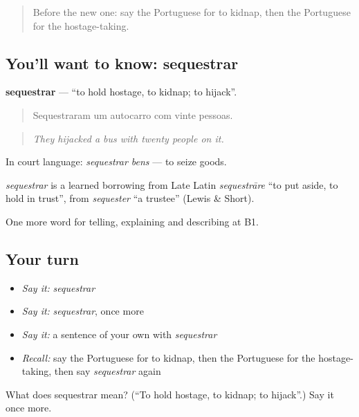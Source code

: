 \begin{quote}
Before the new one: say the Portuguese for to kidnap, then the Portuguese for the hostage-taking.
\end{quote}

\subsection*{You'll want to know: sequestrar}
\textbf{sequestrar} — \textquotedblleft{}to hold hostage, to kidnap; to hijack\textquotedblright{}.

\begin{quote}
Sequestraram um autocarro com vinte pessoas.
\end{quote}

\begin{quote}
\emph{They hijacked a bus with twenty people on it.}
\end{quote}

In court language: \emph{sequestrar bens} — to seize goods.

\begin{cousinweb}
\emph{sequestrar} is a learned borrowing from Late Latin \emph{sequestrāre} \textquotedblleft{}to put aside, to hold in trust\textquotedblright{}, from \emph{sequester} \textquotedblleft{}a trustee\textquotedblright{} (Lewis \& Short).
\end{cousinweb}

\begin{grammarlens}[title={What you've built}]
One more word for telling, explaining and describing at B1.
\end{grammarlens}

\subsection*{Your turn}
\begin{itemize}
\raggedright
  \item \emph{Say it:} \emph{sequestrar}
  \item \emph{Say it:} \emph{sequestrar}, once more
  \item \emph{Say it:} a sentence of your own with \emph{sequestrar}
  \item \emph{Recall:} say the Portuguese for to kidnap, then the Portuguese for the hostage-taking, then say \emph{sequestrar} again
\end{itemize}

\begin{tcolorbox}[breakable,colback=teal!4,colframe=teal!35!black,title={Before you move on}]
What does sequestrar mean? (\textquotedblleft{}To hold hostage, to kidnap; to hijack\textquotedblright{}.) Say it once more.
\end{tcolorbox}
